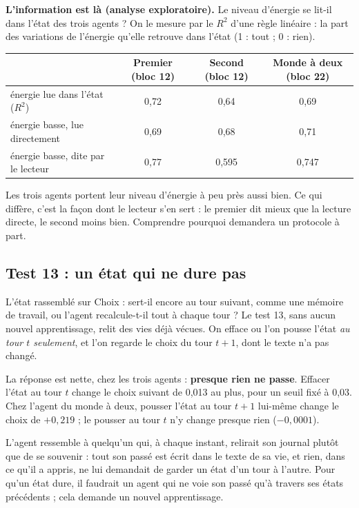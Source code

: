 \documentclass[fontsize=10pt,paper=a4,parskip=half-]{scrartcl}
\newcommand{\q}[1]{\og #1\fg{}}
\begin{document}
\textbf{L'information est là (analyse exploratoire).} Le niveau d'énergie se lit-il dans
l'état des trois agents ? On le mesure par le $R^2$ d'une règle linéaire : la part des
variations de l'énergie qu'elle retrouve dans l'état (1 : tout ; 0 : rien).

\begin{center}\small
\begin{tabular}{lccc}
\toprule
 & \textsf{Premier (bloc 12)} & \textsf{Second (bloc 12)} & \textsf{Monde à deux (bloc 22)}\\
\midrule
énergie lue dans l'état ($R^2$) & 0,72 & 0,64 & 0,69\\
\q{énergie basse}, lue directement & 0,69 & 0,68 & 0,71\\
\q{énergie basse}, dite par le lecteur & 0,77 & 0,595 & 0,747\\
\bottomrule
\end{tabular}
\end{center}

Les trois agents portent leur niveau d'énergie à peu près aussi bien. Ce qui diffère,
c'est la façon dont le lecteur s'en sert : le premier dit mieux que la lecture directe, le
second moins bien. Comprendre pourquoi demandera un protocole à part.

\subsection{Test 13 : un état qui ne dure pas}
L'état rassemblé sur \q{Choix :} sert-il encore au tour suivant, comme une mémoire de
travail, ou l'agent recalcule-t-il tout à chaque tour ? Le test 13, sans aucun nouvel
apprentissage, relit des vies déjà vécues. On efface ou l'on pousse l'état \emph{au tour
$t$ seulement}, et l'on regarde le choix du tour $t+1$, dont le texte n'a pas changé.

La réponse est nette, chez les trois agents : \textbf{presque rien ne passe}. Effacer
l'état au tour $t$ change le choix suivant de 0,013 au plus, pour un seuil fixé à 0,03.
Chez l'agent du monde à deux, pousser l'état au tour $t+1$ lui-même change le choix de
$+0,219$ ; le pousser au tour $t$ n'y change presque rien ($-0,0001$).

L'agent ressemble à quelqu'un qui, à chaque instant, relirait son journal plutôt que de
se souvenir : tout son passé est écrit dans le texte de sa vie, et rien, dans ce qu'il a
appris, ne lui demandait de garder un état d'un tour à l'autre. Pour qu'un état dure, il
faudrait un agent qui ne voie son passé qu'à travers ses états précédents ; cela demande
un nouvel apprentissage.
\end{document}
